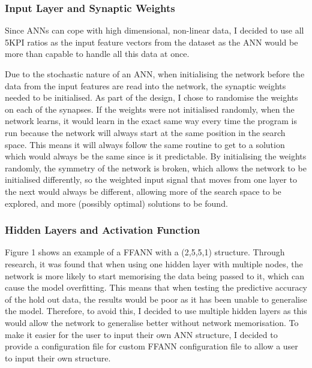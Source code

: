 \documentclass[11pt]{article}
\begin{document}
\subsubsection{Input Layer and Synaptic Weights}
Since ANNs can cope with high dimensional, non-linear data, I decided to use all 5KPI ratios as the input feature vectors from the dataset as the ANN would be more than capable to handle all this data at once.

Due to the stochastic nature of an ANN, when initialising the network before the data from the input features are read into the network, the synaptic weights needed to be initialised. As part of the design, I chose to randomise the weights on each of the synapses. If the weights were not initialised randomly, when the network learns, it would learn in the exact same way every time the program is run because the network will always start at the same position in the search space. This means it will always follow the same routine to get to a solution which would always be the same since is it predictable.  By initialising the weights randomly, the symmetry of the network is broken, which allows the network to be initialised differently, so the weighted input signal that moves from one layer to the next would always be different, allowing more of the search space to be explored, and more (possibly optimal) solutions to be found.
\subsubsection{Hidden Layers and Activation Function}%
Figure 1 shows an example of a FFANN with a (2,5,5,1) structure. Through research, it was found that when using one hidden layer with multiple nodes, the network is more likely to start memorising the data being passed to it, which can cause the model overfitting\cite{?}. This means that when testing the predictive accuracy of the hold out data, the results would be poor as it has been unable to generalise the model. Therefore, to avoid this, I decided to use multiple hidden layers as this would allow the network to generalise better without network memorisation.  To make it easier for the user to input their own ANN structure, I decided to provide a configuration file for custom FFANN configuration file to allow a user to input their own structure. 
\end{document}

